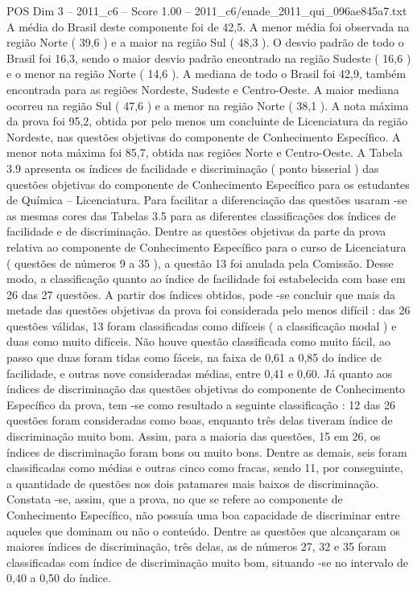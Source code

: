 \begin{textsample}{POS Dim 3 – 2011\_c6 – Score 1.00 – 2011\_c6/enade\_2011\_qui\_096ae845a7.txt}
A média do Brasil deste componente foi de 42,5.
A menor média foi observada na região Norte ( 39,6 ) e a maior na região Sul ( 48,3 ).
O desvio padrão de todo o Brasil foi 16,3, sendo o maior desvio padrão encontrado na região Sudeste ( 16,6 ) e o menor na região Norte ( 14,6 ).
A mediana de todo o Brasil foi 42,9, também encontrada para as regiões Nordeste, Sudeste e Centro-Oeste.
A maior mediana ocorreu na região Sul ( 47,6 ) e a menor na região Norte ( 38,1 ).
A nota máxima da prova foi 95,2, obtida por pelo menos um concluinte de Licenciatura da região Nordeste, nas questões objetivas do componente de Conhecimento Específico.
A menor nota máxima foi 85,7, obtida nas regiões Norte e Centro-Oeste.
A Tabela 3.9 apresenta os índices de facilidade e discriminação ( ponto bisserial ) das questões objetivas do componente de Conhecimento Específico para os estudantes de Química – Licenciatura.
Para facilitar a diferenciação das questões usaram -se as mesmas cores das Tabelas 3.5 para as diferentes classificações dos índices de facilidade e de discriminação.
Dentre as questões objetivas da parte da prova relativa ao componente de Conhecimento Específico para o curso de Licenciatura ( questões de números 9 a 35 ), a questão 13 foi anulada pela Comissão.
Desse modo, a classificação quanto ao índice de facilidade foi estabelecida com base em 26 das 27 questões.
A partir dos índices obtidos, pode -se concluir que mais da metade das questões objetivas da prova foi considerada pelo menos difícil : das 26 questões válidas, 13 foram classificadas como difíceis ( a classificação modal ) e duas como muito difíceis.
Não houve questão classificada como muito fácil, ao passo que duas foram tidas como fáceis, na faixa de 0,61 a 0,85 do índice de facilidade, e outras nove consideradas médias, entre 0,41 e 0,60.
Já quanto aos índices de discriminação das questões objetivas do componente de Conhecimento Específico da prova, tem -se como resultado a seguinte classificação : 12 das 26 questões foram consideradas como boas, enquanto três delas tiveram índice de discriminação muito bom.
Assim, para a maioria das questões, 15 em 26, os índices de discriminação foram bons ou muito bons.
Dentre as demais, seis foram classificadas como médias e outras cinco como fracas, sendo 11, por conseguinte, a quantidade de questões nos dois patamares mais baixos de discriminação.
Constata -se, assim, que a prova, no que se refere ao componente de Conhecimento Específico, não possuía uma boa capacidade de discriminar entre aqueles que dominam ou não o conteúdo.
Dentre as questões que alcançaram os maiores índices de discriminação, três delas, as de números 27, 32 e 35 foram classificadas com índice de discriminação muito bom, situando -se no intervalo de 0,40 a 0,50 do índice.

\end{textsample}
